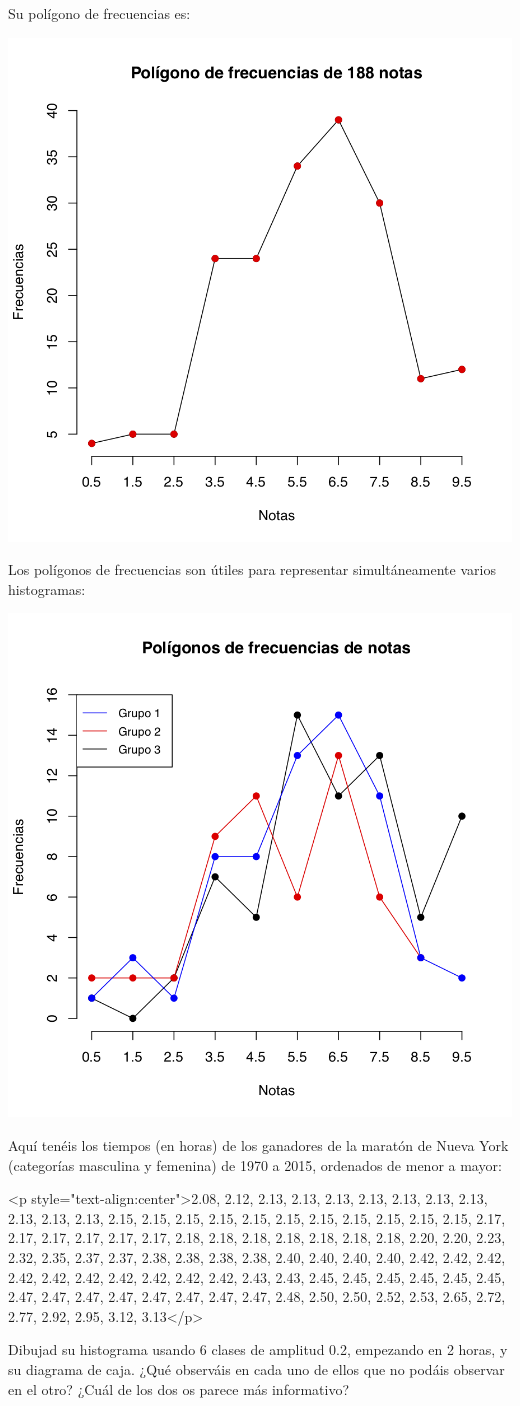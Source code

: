 \documentclass[
]{book}
\theoremstyle{definition}
\theoremstyle{definition}
\theoremstyle{definition}
\theoremstyle{definition}
\theoremstyle{remark}
\begin{document}
Su polígono de frecuencias es:

\begin{center}\includegraphics[width=0.6\linewidth]{INREMDN_files/figure-html/polfrec1} \end{center}

Los polígonos de frecuencias son útiles para representar simultáneamente varios histogramas:


\begin{center}\includegraphics[width=0.6\linewidth]{INREMDN_files/figure-html/polfrec2} \end{center}

\begin{rmdexercici}
Aquí tenéis los tiempos (en horas) de los ganadores de la maratón de Nueva York (categorías masculina y femenina) de 1970 a 2015, ordenados de menor a mayor:
  
<p style="text-align:center">2.08, 2.12, 2.13, 2.13, 2.13, 2.13, 2.13, 2.13, 2.13, 2.13, 2.13, 2.13, 2.15, 2.15, 2.15, 2.15, 2.15, 2.15, 2.15, 2.15, 2.15, 2.15, 2.15, 2.17, 2.17, 2.17, 2.17, 2.17, 2.17, 2.18, 2.18, 2.18, 2.18, 2.18, 2.18, 2.18, 2.20, 2.20, 2.23, 2.32, 2.35, 2.37, 2.37, 2.38, 2.38, 2.38, 2.38, 2.40, 2.40, 2.40, 2.40, 2.42, 2.42, 2.42, 2.42, 2.42, 2.42, 2.42, 2.42, 2.42,  2.42, 2.43, 2.43, 2.45, 2.45, 2.45, 2.45, 2.45, 2.45, 2.47, 2.47, 2.47, 2.47, 2.47, 2.47, 2.47, 2.47, 2.48, 2.50, 2.50, 2.52, 2.53, 2.65, 2.72, 2.77, 2.92, 2.95, 3.12, 3.13</p>

Dibujad su histograma usando 6 clases de amplitud 0.2, empezando en 2 horas, y su diagrama de caja. ¿Qué observáis en cada uno de ellos que no podáis observar en el otro? ¿Cuál de los dos os parece más informativo?
  
\end{rmdexercici}
\end{document}
